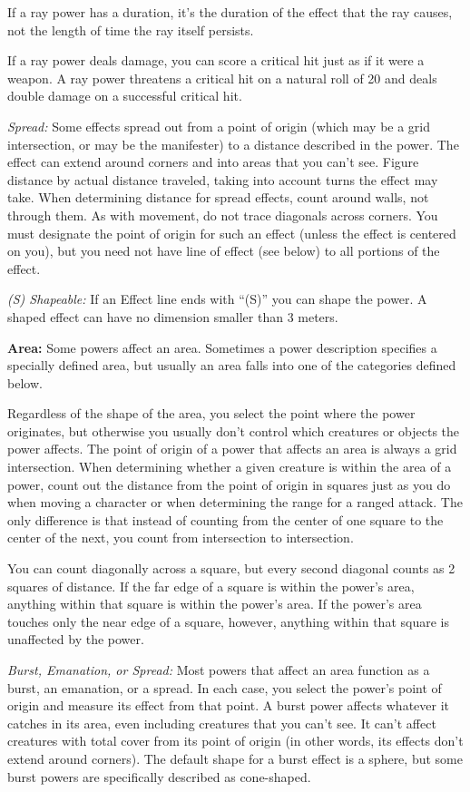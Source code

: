 If a ray power has a duration, it's the duration of the effect that the ray causes, not the length of time the ray itself persists.

If a ray power deals damage, you can score a critical hit just as if it were a weapon. A ray power threatens a critical hit on a natural roll of 20 and deals double damage on a successful critical hit.

\textit{Spread:} Some effects spread out from a point of origin (which may be a grid intersection, or may be the manifester) to a distance described in the power. The effect can extend around corners and into areas that you can't see. Figure distance by actual distance traveled, taking into account turns the effect may take. When determining distance for spread effects, count around walls, not through them. As with movement, do not trace diagonals across corners. You must designate the point of origin for such an effect (unless the effect is centered on you), but you need not have line of effect (see below) to all portions of the effect.

\textit{(S) Shapeable:} If an Effect line ends with ``(S)'' you can shape the power. A shaped effect can have no dimension smaller than 3 meters.

\textbf{Area:} Some powers affect an area. Sometimes a power description specifies a specially defined area, but usually an area falls into one of the categories defined below.

Regardless of the shape of the area, you select the point where the power originates, but otherwise you usually don't control which creatures or objects the power affects. The point of origin of a power that affects an area is always a grid intersection. When determining whether a given creature is within the area of a power, count out the distance from the point of origin in squares just as you do when moving a character or when determining the range for a ranged attack. The only difference is that instead of counting from the center of one square to the center of the next, you count from intersection to intersection.

You can count diagonally across a square, but every second diagonal counts as 2 squares of distance. If the far edge of a square is within the power's area, anything within that square is within the power's area. If the power's area touches only the near edge of a square, however, anything within that square is unaffected by the power.

\textit{Burst, Emanation, or Spread:} Most powers that affect an area function as a burst, an emanation, or a spread. In each case, you select the power's point of origin and measure its effect from that point. A burst power affects whatever it catches in its area, even including creatures that you can't see. It can't affect creatures with total cover from its point of origin (in other words, its effects don't extend around corners). The default shape for a burst effect is a sphere, but some burst powers are specifically described as cone-shaped.

